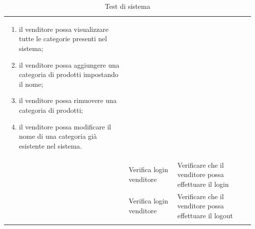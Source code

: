 \begin{center}
\begin{longtable}{|p{1cm}|p{4.85cm}|p{9cm}|}
\begin{enumerate}
		\item il venditore possa visualizzare tutte le categorie presenti nel sistema;
		\item il venditore possa aggiungere una categoria di prodotti impostando il nome;
		\item il venditore possa rimuovere una categoria di prodotti;
		\item il venditore possa modificare il nome di una categoria già esistente nel sistema.
	\end{enumerate} \\
	 & Verifica login venditore & Verificare che il venditore possa effettuare il login \\
	 & Verifica login venditore & Verificare che il venditore possa effettuare il logout \\
	\hline
	\caption{Test di sistema}
	\end{longtable}
\end{center}


